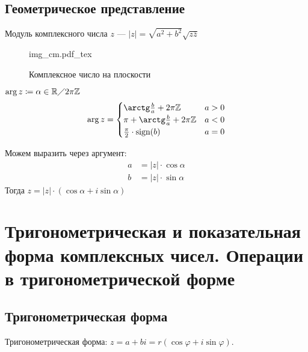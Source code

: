 \documentclass[11pt]{book}
\newcommand{\incfig}[1]{%
    \def\svgwidth{\columnwidth}
    {#1.pdf_tex}
}
\newcommand{\Z}{\mathbb{Z}}
\newcommand{\R}{\mathbb{R}}
\newcommand{\po}{\diagup}
\newcommand{\sign}{{\mathop{\text{\rm sign}}}}
\theoremstyle{definition}
\theoremstyle{plain}
\theoremstyle{plain}
\theoremstyle{definition}
\theoremstyle{remark}
\begin{document}
\subsection{Геометрическое представление}
\begin{defn}
    {\sf Модуль комплексного числа} $ z$ --- $ |z| = \sqrt{a^2+b^2} \sqrt{z \overline{z}}$
\end{defn}
\begin{figure}[ht]
    \centering
    \incfig{img_cm}
    \caption{Комплексное число на плоскости}
    \label{fig:img_cm}
\end{figure}
\begin{defn}
    $ \arg z \coloneqq \alpha \in \R \po 2\pi\Z$
    \[
	\arg z =
	\begin{cases}
	    \arctg \frac{b}{a} + 2 \pi\Z & a > 0\\
	    \pi+ \arctg \frac{b}{a} + 2\pi\Z & a<0 \\
	    \frac{\pi}{2} \cdot \sign(b) & a = 0
	\end{cases}
    \]
\end{defn}
Можем выразить через аргумент:
\begin{align*}
    a &= |z| \cdot  \cos \alpha \\
    b &= |z| \cdot  \sin \alpha
\end{align*}
Тогда $ z = |z| \cdot (\cos\alpha + i \sin\alpha)$
\section{Тригонометрическая и показательная форма комплексных  чисел. Операции в тригонометрической форме}
\subsection{Тригонометрическая форма}
Тригонометрическая форма: $ z = a + bi = r(\cos \varphi  + i \sin \varphi )$.
\end{document}
